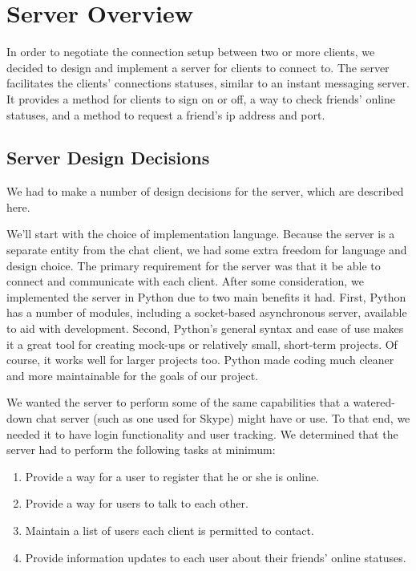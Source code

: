 
\section{Server Overview}

In order to negotiate the connection setup between two or more clients, we decided to
design and implement a server for clients to connect to. The server 
facilitates the clients' connections statuses, similar to an instant messaging server. It
provides a method for clients to sign on or off, a way to check friends' online
statuses, and a method to request a friend's ip address and port.

\subsection{Server Design Decisions}

We had to make a number of design decisions for the server, which are described here.

We'll start with the choice of implementation language. Because the server is a separate entity from the chat client, we had some extra freedom for language and design choice. The primary requirement for the server was that it be able to connect and communicate with each client. After some consideration, we implemented the server in Python due to two main benefits it had. First, Python has a number of modules, including a socket-based asynchronous server, available to aid with development. Second, Python's general syntax and ease of use makes it a great tool for creating mock-ups or relatively small, short-term projects. Of course, it works well for larger projects too. Python made coding much cleaner and more maintainable for the goals of our project.

We wanted the server to perform some of the same capabilities that a watered-down chat server (such as one used for Skype) might have or use. To that end, we needed it to have login functionality and user tracking. We determined that the server had to perform the following tasks at minimum:

\begin{enumerate}
  \item Provide a way for a user to register that he or she is online.
  \item Provide a way for users to talk to each other.
  \item Maintain a list of users each client is permitted to contact.
  \item Provide information updates to each user about their friends' online statuses.
\end{enumerate}

